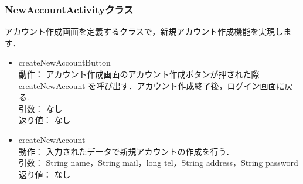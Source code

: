 \documentclass[a4j,titlepage]{jarticle}
\begin{document}
\subsubsection{NewAccountActivityクラス}
アカウント作成画面を定義するクラスで，新規アカウント作成機能を実現します．
\begin{itemize}
\item createNewAccountButton\\
動作： アカウント作成画面のアカウント作成ボタンが押された際 createNewAccount を呼び出す．アカウント作成終了後，ログイン画面に戻る.\\
引数： なし\\
返り値： なし

\item createNewAccount\\
動作： 入力されたデータで新規アカウントの作成を行う．\\
引数： String name，String mail，long tel，String address，String password\\
返り値： なし
\end{itemize}
\end{document}
